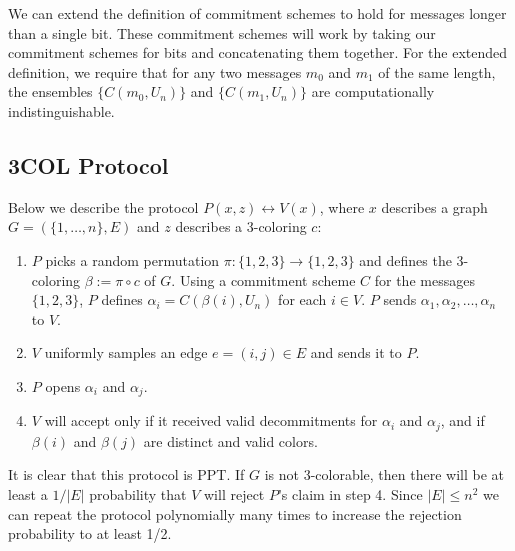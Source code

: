 \medskip
We can extend the definition of commitment schemes to hold for messages longer than a single bit. These commitment schemes will work by taking our commitment schemes for bits and concatenating them together. For the extended definition, we require that for any two messages $m_0$ and $m_1$ of the same length, the ensembles $\{ C(m_0, U_n) \}$ and $\{ C(m_1, U_n) \}$ are computationally indistinguishable.

\subsection{3COL Protocol}

Below we describe the protocol $P(x,z) \leftrightarrow V(x)$, where $x$ describes a graph $G = (\{1, \ldots, n \}, E)$ and $z$ describes a 3-coloring $c$:

\begin{enumerate}
\item $P$ picks a random permutation $\pi : \{ 1, 2, 3 \} \to \{ 1, 2, 3 \}$ and defines the 3-coloring $\beta := \pi \circ c$ of $G$. Using a commitment scheme $C$ for the messages $\{ 1, 2, 3 \}$, $P$ defines $\alpha_i = C(\beta(i), U_n)$ for each $i \in V$. $P$ sends $\alpha_1, \alpha_2, \ldots, \alpha_n$ to $V$.

\item $V$ uniformly samples an edge $e = (i, j) \in E$ and sends it to $P$.

\item $P$ opens $\alpha_i$ and $\alpha_j$.

\item $V$ will accept only if it received valid decommitments for $\alpha_i$ and $\alpha_j$, and if $\beta(i)$ and $\beta(j)$ are distinct and valid colors.

\end{enumerate}

It is clear that this protocol is PPT. If $G$ is not 3-colorable, then there will be at least a $1/|E|$ probability that $V$ will reject $P$'s claim in step 4. Since $|E| \leq n^2$ we can repeat the protocol polynomially many times to increase the rejection probability to at least 1/2.

